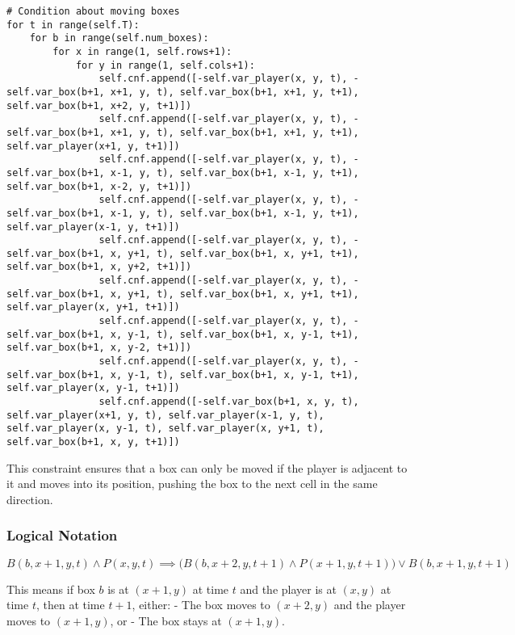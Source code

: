 \documentclass[12pt,a4paper]{article}
\begin{document}
\begin{lstlisting}
# Condition about moving boxes
for t in range(self.T):
    for b in range(self.num_boxes):
        for x in range(1, self.rows+1):
            for y in range(1, self.cols+1):
                self.cnf.append([-self.var_player(x, y, t), -self.var_box(b+1, x+1, y, t), self.var_box(b+1, x+1, y, t+1), self.var_box(b+1, x+2, y, t+1)])
                self.cnf.append([-self.var_player(x, y, t), -self.var_box(b+1, x+1, y, t), self.var_box(b+1, x+1, y, t+1), self.var_player(x+1, y, t+1)])
                self.cnf.append([-self.var_player(x, y, t), -self.var_box(b+1, x-1, y, t), self.var_box(b+1, x-1, y, t+1), self.var_box(b+1, x-2, y, t+1)])
                self.cnf.append([-self.var_player(x, y, t), -self.var_box(b+1, x-1, y, t), self.var_box(b+1, x-1, y, t+1), self.var_player(x-1, y, t+1)])
                self.cnf.append([-self.var_player(x, y, t), -self.var_box(b+1, x, y+1, t), self.var_box(b+1, x, y+1, t+1), self.var_box(b+1, x, y+2, t+1)])
                self.cnf.append([-self.var_player(x, y, t), -self.var_box(b+1, x, y+1, t), self.var_box(b+1, x, y+1, t+1), self.var_player(x, y+1, t+1)])
                self.cnf.append([-self.var_player(x, y, t), -self.var_box(b+1, x, y-1, t), self.var_box(b+1, x, y-1, t+1), self.var_box(b+1, x, y-2, t+1)])
                self.cnf.append([-self.var_player(x, y, t), -self.var_box(b+1, x, y-1, t), self.var_box(b+1, x, y-1, t+1), self.var_player(x, y-1, t+1)])
                self.cnf.append([-self.var_box(b+1, x, y, t), self.var_player(x+1, y, t), self.var_player(x-1, y, t), self.var_player(x, y-1, t), self.var_player(x, y+1, t), self.var_box(b+1, x, y, t+1)])
\end{lstlisting}

This constraint ensures that a box can only be moved if the player is adjacent to it and moves into its position, pushing the box to the next cell in the same direction.

\subsubsection*{Logical Notation}

\[
B(b,x+1,y,t) \wedge P(x,y,t) \implies \bigl(B(b,x+2,y,t+1) \wedge P(x+1,y,t+1)\bigr) \vee B(b,x+1,y,t+1)
\]

This means if box \(b\) is at \((x+1,y)\) at time \(t\) and the player is at \((x,y)\) at time \(t\), then at time \(t+1\), either:  
- The box moves to \((x+2,y)\) and the player moves to \((x+1,y)\), or  
- The box stays at \((x+1,y)\).
\end{document}
